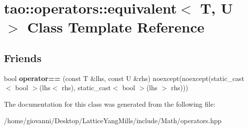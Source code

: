 \hypertarget{classtao_1_1operators_1_1equivalent}{}\section{tao\+:\+:operators\+:\+:equivalent$<$ T, U $>$ Class Template Reference}
\label{classtao_1_1operators_1_1equivalent}
\subsection*{Friends}
\begin{DoxyCompactItemize}
\item 
bool {\bfseries operator==} (const T \&lhs, const U \&rhs) noexcept(noexcept(static\+\_\+cast$<$ bool $>$(lhs$<$ rhs), static\+\_\+cast$<$ bool $>$(lhs $>$ rhs)))\hypertarget{classtao_1_1operators_1_1equivalent_a7434386e535fc4c0d518f04277bd11b7}{}\label{classtao_1_1operators_1_1equivalent_a7434386e535fc4c0d518f04277bd11b7}

\end{DoxyCompactItemize}


The documentation for this class was generated from the following file\+:\begin{DoxyCompactItemize}
\item 
/home/giovanni/\+Desktop/\+Lattice\+Yang\+Mills/include/\+Math/operators.\+hpp\end{DoxyCompactItemize}
